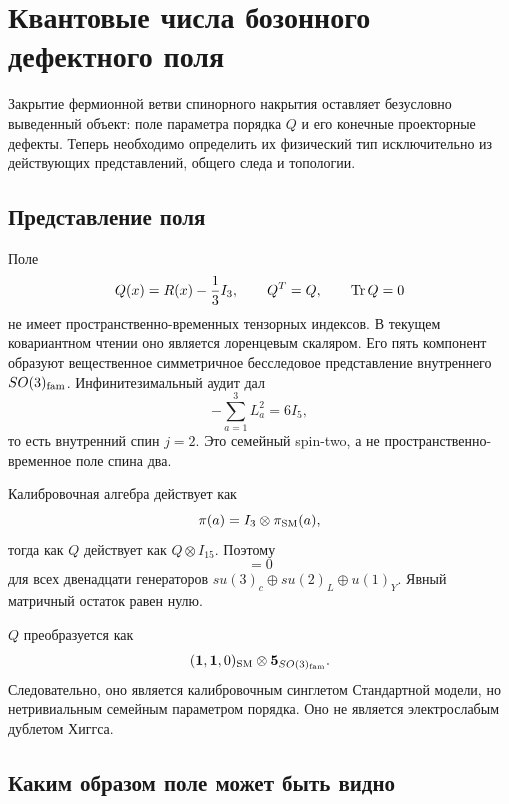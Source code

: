 \chapter{Квантовые числа бозонного дефектного поля}

Закрытие фермионной ветви спинорного накрытия оставляет безусловно выведенный объект:
поле параметра порядка $Q$ и его конечные проекторные дефекты. Теперь
необходимо определить их физический тип исключительно из действующих
представлений, общего следа и топологии.

\section{Представление поля}

Поле
\begin{equation}
 Q(x)=R(x)-\frac13I_3,
 \qquad Q^T=Q,
 \qquad \operatorname{Tr} Q=0
\end{equation}
не имеет пространственно-временных тензорных индексов. В текущем
ковариантном чтении оно является лоренцевым скаляром. Его пять компонент
образуют вещественное симметричное бесследовое представление внутреннего
$SO(3)_{\rm fam}$. Инфинитезимальный аудит дал
\begin{equation}
 -\sum_{a=1}^3L_a^2=6I_5,
\end{equation}
то есть внутренний спин $j=2$. Это семейный spin-two, а не
пространственно-временное поле спина два.

Калибровочная алгебра действует как
\begin{equation}
 \pi(a)=I_3\otimes\pi_{\rm SM}(a),
\end{equation}
тогда как $Q$ действует как $Q\otimes I_{15}$. Поэтому
\begin{equation}
 [Q\otimes I_{15},I_3\otimes\pi_{\rm SM}(a)]=0
\end{equation}
для всех двенадцати генераторов
$su(3)_c\oplus su(2)_L\oplus u(1)_Y$. Явный матричный остаток равен нулю.

\begin{theorem}
$Q$ преобразуется как
\begin{equation}
 (\mathbf1,\mathbf1,0)_{\rm SM}\otimes\mathbf5_{SO(3)_{\rm fam}}.
\end{equation}
Следовательно, оно является калибровочным синглетом Стандартной модели,
но нетривиальным семейным параметром порядка. Оно не является
электрослабым дублетом Хиггса.
\end{theorem}

\section{Каким образом поле может быть видно}

